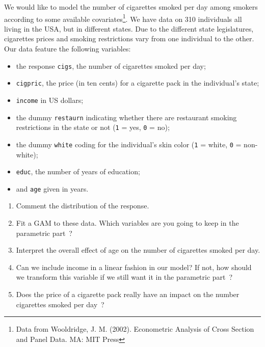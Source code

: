 \documentclass[a4paper,12pt]{article}\usepackage[]{graphicx}\usepackage[]{color}
\begin{document}
We would like to model the number of cigarettes smoked per day among smokers according to some available covariates\footnote{Data from Wooldridge, J. M. (2002). Econometric Analysis of Cross Section and Panel Data. MA: MIT Press}. We have data on 310 individuals all living in the USA, but in different states. Due to the different state legislatures, cigarettes prices and smoking restrictions vary from one individual to the other. Our data feature the following variables:
\begin{itemize}
\item{the response \texttt{cigs}, the number of cigarettes smoked per day;}
\item{\texttt{cigpric}, the price (in ten cents) for a cigarette pack in the individual's state;}
\item{\texttt{income} in US dollars;}
\item{the dummy \texttt{restaurn} indicating whether there are restaurant smoking restrictions in the state or not (\texttt{1} = yes, \texttt{0} = no);}
\item{the dummy \texttt{white} coding for the individual's skin color (\texttt{1} = white, \texttt{0} = non-white);}
\item{\texttt{educ}, the number of years of education;}
\item{and \texttt{age} given in years.}
\end{itemize}

\begin{enumerate}
\item{Comment the distribution of the response.}
\item{Fit a GAM to these data. Which variables are you going to keep in the parametric part~?}
\item{Interpret the overall effect of age on the number of cigarettes smoked per day.}
\item{Can we include income in a linear fashion in our model? If not, how should we transform this variable if we still want it in the parametric part~?}
\item{Does the price of a cigarette pack really have an impact on the number cigarettes smoked per day~?}
\end{enumerate}
\end{document}
